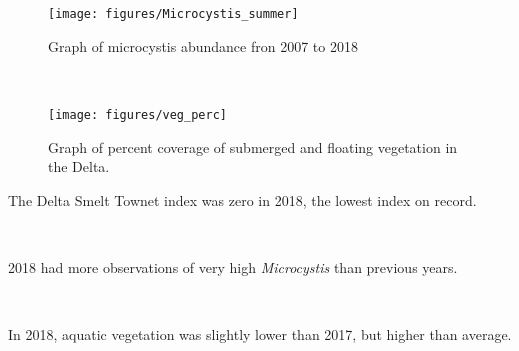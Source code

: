 \documentclass[
]{book}
\begin{document}
\begin{panel-grid}
\begin{columns-nocenter}
\begin{column800}
\begin{expand}
\begin{figure}
\texttt{[image: figures/Microcystis\_summer]} \caption{Graph of microcystis abundance fron 2007 to 2018}\label{fig:unnamed-chunk-89}
\end{figure}

\end{expand}

\end{column800}

\begin{column40}

~

\end{column40}

\begin{column800}

\begin{expand}

\begin{figure}
\texttt{[image: figures/veg\_perc]} \caption{Graph of percent coverage of submerged and floating vegetation in the Delta.}\label{fig:unnamed-chunk-90}
\end{figure}

\end{expand}

\end{column800}

\end{columns-nocenter}

\begin{columns-nocenter}

\begin{column800}

The Delta Smelt Townet index was zero in 2018, the lowest index on record.

\end{column800}

\begin{column40}

~

\end{column40}

\begin{column800}

2018 had more observations of very high \emph{Microcystis} than previous years.

\end{column800}

\begin{column40}

~

\end{column40}

\begin{column800}

In 2018, aquatic vegetation was slightly lower than 2017, but higher than average.

\end{column800}

\end{columns-nocenter}

\end{panel-grid}
\end{document}
